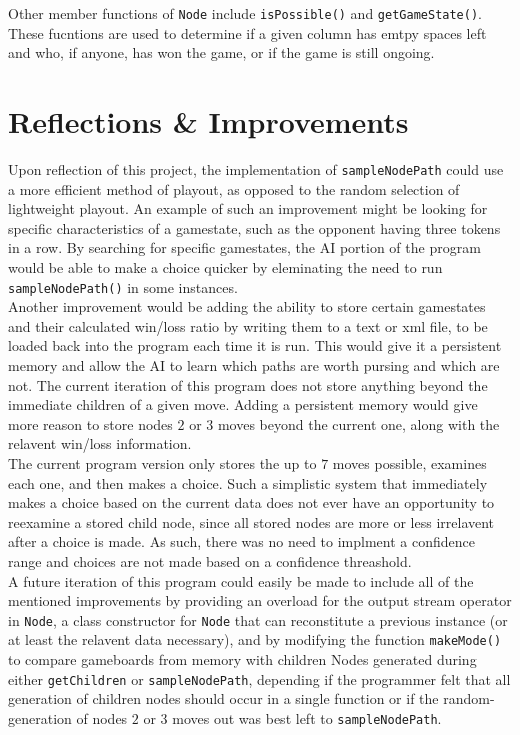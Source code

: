 \documentclass[fleqn]{article}
\begin{document}
  Other member functions of \texttt{Node} include \texttt{isPossible()} and \texttt{getGameState()}. These fucntions are used to determine if a given column has emtpy spaces left and who, if anyone, has won the game, or if the game is still ongoing.

  \section{Reflections \& Improvements}
  Upon reflection of this project, the implementation of \texttt{sampleNodePath} could use a more efficient method of playout, as opposed to the random selection of lightweight playout. An example of such an improvement might be looking for specific characteristics of a gamestate, such as the opponent having three tokens in a row. By searching for specific gamestates, the AI portion of the program would be able to make a choice quicker by eleminating the need to run \texttt{sampleNodePath()} in some instances. \\

  Another improvement would be adding the ability to store certain gamestates and their calculated win/loss ratio by writing them to a text or xml file, to be loaded back into the program each time it is run. This would give it a persistent memory and allow the AI to learn which paths are worth pursing and which are not. The current iteration of this program does not store anything beyond the immediate children of a given move. Adding a persistent memory would give more reason to store nodes $2$ or $3$ moves beyond the current one, along with the relavent win/loss information. \\

  The current program version only stores the up to $7$ moves possible, examines each one, and then makes a choice. Such a simplistic system that immediately makes a choice based on the current data does not ever have an opportunity to reexamine a stored child node, since all stored nodes are more or less irrelavent after a choice is made. As such, there was no need to implment a confidence range and choices are not made based on a confidence threashold. \\

  A future iteration of this program could easily be made to include all of the mentioned improvements by providing an overload for the output stream operator in \texttt{Node}, a class constructor for \texttt{Node} that can reconstitute a previous instance (or at least the relavent data necessary), and by modifying the function \texttt{makeMode()} to compare gameboards from memory with children Nodes generated during either \texttt{getChildren} or \texttt{sampleNodePath}, depending if the programmer felt that all generation of children nodes should occur in a single function or if the random-generation of nodes $2$ or $3$ moves out was best left to \texttt{sampleNodePath}.
\end{document}

